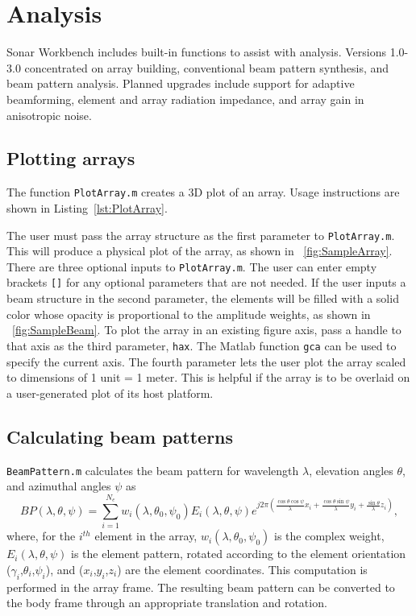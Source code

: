 \section{Analysis}\label{sec:analysis}

Sonar Workbench includes built-in functions to assist with analysis.  Versions 1.0-3.0 concentrated on array building, conventional beam pattern synthesis, and beam pattern analysis.  Planned upgrades include support for adaptive beamforming, element and array radiation impedance, and array gain in anisotropic noise.

\subsection{Plotting arrays}

The function \texttt{PlotArray.m} creates a 3D plot of an array. Usage instructions are shown in Listing~\ref{lst:PlotArray}.


 
The user must pass the array structure as the first parameter to \texttt{PlotArray.m}. This will produce a physical plot of the array, as shown in \figname~\ref{fig:SampleArray}. There are three optional inputs to \texttt{PlotArray.m}. The user can enter empty brackets \texttt{[]} for any optional parameters that are not needed. If the user inputs a beam structure in the second parameter, the elements will be filled with a solid color whose opacity is proportional to the amplitude weights, as shown in \figname~\ref{fig:SampleBeam}. To plot the array in an existing figure axis, pass a handle to that axis as the third parameter, \texttt{hax}. The Matlab function \texttt{gca} can be used to specify the current axis. The fourth parameter lets the user plot the array scaled to dimensions of 1 unit = 1 meter. This is helpful if the array is to be overlaid on a user-generated plot of its host platform. 
 
\subsection{Calculating beam patterns}

\texttt{BeamPattern.m} calculates the beam pattern for wavelength $\lambda$, elevation angles $\theta$, and azimuthal angles $\psi$ as
\begin{equation}
BP(\lambda,\theta,\psi) = \sum_{i=1}^{N_e} w_i(\lambda,\theta_0,\psi_0)E_i(\lambda,\theta,\psi)e^{j2\pi\left(\frac{\cos\theta\cos\psi}{\lambda}x_i + \frac{\cos\theta\sin\psi}{\lambda}y_i + \frac{\sin\theta}{\lambda}z_i\right)},
\end{equation}
where, for the $i^{th}$ element in the array, $w_i(\lambda,\theta_0,\psi_0)$ is the complex weight, $E_i(\lambda,\theta,\psi)$ is the element pattern, rotated according to the element orientation ($\gamma_i$,$\theta_i$,$\psi_i$), and ($x_i$,$y_i$,$z_i$) are the element coordinates. This computation is performed in the array frame. The resulting beam pattern can be converted to the body frame through an appropriate translation and rotation.

